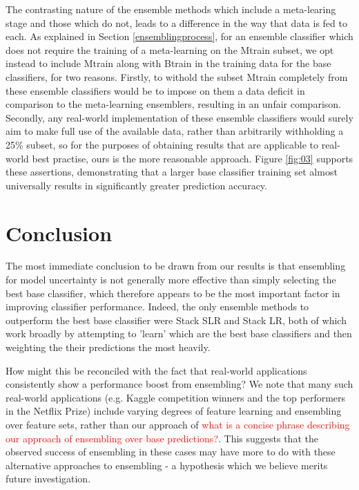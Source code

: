 \documentclass{bioinfo}
\begin{document}
\noindent
The contrasting nature of the ensemble methods which include a meta-learing stage and those which do not, leads to a difference in the way that data is fed to each. As explained in Section \ref{ensemblingprocess}, for an ensemble classifier which does not require the training of a meta-learning on the Mtrain subset, we opt instead to include Mtrain along with Btrain in the training data for the base classifiers, for two reasons. Firstly, to withold the subset Mtrain completely from these ensemble classifiers would be to impose on them a data deficit in comparison to the meta-learning ensemblers, resulting in an unfair comparison. Secondly, any real-world implementation of these ensemble classifiers would surely aim to make full use of the available data, rather than arbitrarily withholding a 25\% subset, so for the purposes of obtaining results that are applicable to real-world best practise, ours is the more reasonable approach. Figure \ref{fig:03} supports these assertions, demonstrating that a larger base classifier training set almost universally results in significantly greater prediction accuracy.


\vspace{-0.5cm}
\section{Conclusion}

The most immediate conclusion to be drawn from our results is that ensembling for model uncertainty is not generally more effective than simply selecting the best base classifier, which therefore appears to be the most important factor in improving classifier performance. Indeed, the only ensemble methods to outperform the best base classifier were Stack SLR and Stack LR, both of which work broadly by attempting to 'learn' which are the best base classifiers and then weighting the their predictions the most heavily.

How might this be reconciled with the fact that real-world applications consistently show a performance boost from ensembling? We note that many such real-world applications (e.g. Kaggle competition winners and the top performers in the Netflix Prize) include varying degrees of feature learning and ensembling over feature sets, rather than our approach of \textcolor{red}{what is a concise phrase describing our approach of ensembling over base predictions?}. This suggests that the observed success of ensembling in these cases may have more to do with these alternative approaches to ensembling - a hypothesis which we believe merits future investigation.
\end{document}
